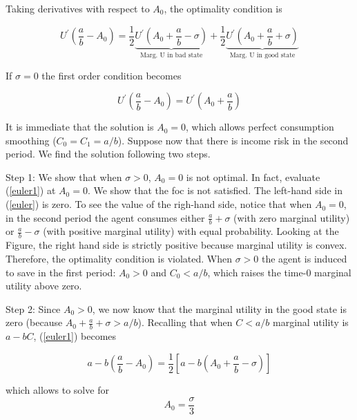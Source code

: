 \documentclass[a4paper,11pt]{article}
\begin{document}
\begin{enumerate}
\noindent Taking derivatives with respect to $A_0$, the optimality condition is 



\begin{equation}
U^{\prime}(\frac{a}{b}-A_0)= \frac{1}{2} \underset{\text{Marg. U in bad state}}{\underbrace{U^{\prime}(A_0+\frac{a}{b}-\sigma)}} + \frac{1}{2} \underset{\text{Marg. U in good state}}{\underbrace{U^{\prime}(A_0+\frac{a}{b}+\sigma)}}
\label{euler1}
\end{equation}%




If $\sigma=0$ the first order condition becomes 

\begin{equation}
U^{\prime}(\frac{a}{b}-A_0)=  U^{\prime}(A_0+\frac{a}{b})
\label{2 - CB1}
\end{equation}%

It is immediate that the solution is $A_0=0$, which allows perfect consumption smoothing ($ C_0=C_1=a/b $). Suppose now that there is income risk in the second period. We find the solution following two steps. 


Step 1: We show that when $\sigma>0$, $A_0=0$ is not optimal.  In fact, evaluate  (\ref{euler1}) at $A_0=0$. We show that the foc is not satisfied. The left-hand side in (\ref{euler}) is zero. To see the value of the righ-hand side, notice that when $A_0=0$, in the second period the agent consumes either $\frac{a}{b}+\sigma$ (with zero marginal utility) or $\frac{a}{b}-\sigma$ (with positive marginal utility) with equal probability. Looking at the Figure, the right hand side is strictly positive because marginal utility is convex.  Therefore, the optimality condition is violated. When $\sigma>0$ the agent is induced to save in the first period: $A_0>0$ and $C_0<a/b$, which raises the time-0 marginal utility above zero. 

Step 2: Since  $A_0>0$, we now know that the marginal utility in the good state is zero (because $A_0+\frac{a}{b}+\sigma>a/b$). Recalling that when $C<a/b$ marginal utility is $a-bC$, (\ref{euler1}) becomes

\begin{equation}
a-b(\frac{a}{b}-A_0) =  \frac{1}{2} [a-b (A_0+\frac{a}{b}-\sigma)]
\label{euler}
\end{equation}%

which allows to solve for \begin{equation}A_0= \frac{\sigma}{3} \end{equation}


\end{enumerate}
\end{document}
